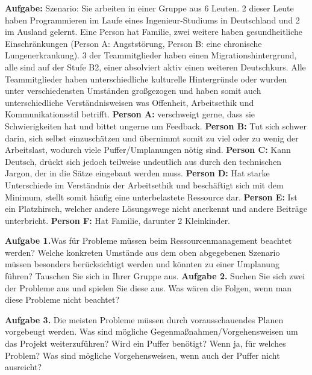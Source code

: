 \documentclass[a4paper]{article}
\begin{document}
\begin{flushleft}

\textbf{Aufgabe:}\newline \newline
Szenario: Sie arbeiten in einer Gruppe aus 6 Leuten. 2 dieser Leute haben Programmieren im Laufe eines Ingenieur-Studiums in Deutschland und 2 im Ausland gelernt. Eine Person hat Familie, zwei weitere haben gesundheitliche Einschränkungen (Person A: Angststörung, Person B: eine chronische Lungenerkrankung). 3 der Teammitglieder haben einen Migrationshintergrund, alle sind auf der Stufe B2, einer absolviert aktiv einen weiteren Deutschkurs. Alle Teammitglieder haben unterschiedliche kulturelle Hintergründe oder wurden unter verschiedensten Umständen großgezogen und haben somit auch unterschiedliche Verständnisweisen was Offenheit, Arbeitsethik und Kommunikationsstil betrifft. \newpage\textbf{Person A:} verschweigt gerne, dass sie Schwierigkeiten hat und bittet ungerne um Feedback. \newline \textbf{Person B:} Tut sich schwer darin, sich selbst einzuschätzen und übernimmt somit zu viel oder zu wenig der Arbeitslast, wodurch viele Puffer/Umplanungen nötig sind. \newline \textbf{Person C:} Kann Deutsch, drückt sich jedoch teilweise undeutlich aus durch den technischen Jargon, der in die Sätze eingebaut werden muss. \newline \textbf{Person D:} Hat starke Unterschiede im Verständnis der Arbeitsethik und beschäftigt sich mit dem Minimum, stellt somit häufig eine unterbelastete Ressource dar. \newline \textbf{Person E:} Ist ein Platzhirsch, welcher andere Lösungswege nicht anerkennt und andere Beiträge unterbricht. \newline \textbf{Person F:} Hat Familie, darunter 2 Kleinkinder.\newline \newline

\textbf{Aufgabe 1.}\newline Was für Probleme müssen beim Ressourcenmanagement beachtet werden? Welche konkreten Umstände aus dem oben abgegebenen Szenario müssen besonders berücksichtigt werden und könnten zu einer Umplanung führen? Tauschen Sie sich in Ihrer Gruppe aus.\newline \newline
\textbf{Aufgabe 2.} \newline Suchen Sie sich zwei der Probleme aus und spielen Sie diese aus. Was wären die Folgen, wenn man diese Probleme nicht beachtet?\newline

\textbf{Aufgabe 3.} \newline Die meisten Probleme müssen durch vorausschauendes Planen vorgebeugt werden. Was sind mögliche Gegenmaßnahmen/Vorgehensweisen um das Projekt weiterzuführen? Wird ein Puffer benötigt? Wenn ja, für welches Problem? Was sind mögliche Vorgehensweisen, wenn auch der Puffer nicht ausreicht? \newline
\end{flushleft}
\end{document}
